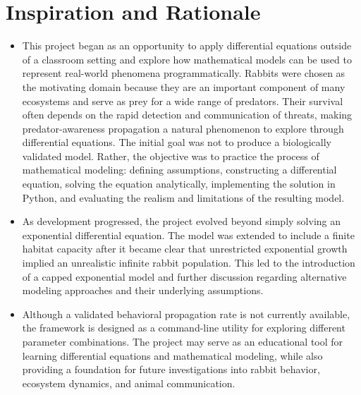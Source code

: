 \documentclass{article}
\begin{document}
\section{Inspiration and Rationale}
\begin{itemize}
    \item This project began as an opportunity to apply differential equations outside of a classroom setting and 
explore how mathematical models can be used to represent real-world phenomena programmatically. Rabbits 
were chosen as the motivating domain because they are an important component of many ecosystems and 
serve as prey for a wide range of predators. Their survival often depends on the rapid detection and 
communication of threats, making predator-awareness propagation a natural phenomenon to explore through 
differential equations. The initial goal was not to produce a biologically validated model. Rather, 
the objective was to practice the process of mathematical modeling: defining assumptions, constructing 
a differential equation, solving the equation analytically, implementing the solution in Python, and 
evaluating the realism and limitations of the resulting model. 
    \item As development progressed, the project evolved beyond simply solving an exponential differential equation. 
The model was extended to include a finite habitat capacity after it became clear that unrestricted exponential 
growth implied an unrealistic infinite rabbit population. This led to the introduction of a capped exponential 
model and further discussion regarding alternative modeling approaches and their underlying assumptions. 
    \item Although a validated behavioral propagation rate is not currently available, the framework is designed as a 
command-line utility for exploring different parameter combinations. The project may serve as an educational tool 
for learning differential equations and mathematical modeling, while also providing a foundation for future 
investigations into rabbit behavior, ecosystem dynamics, and animal communication.
\end{itemize}
\end{document}
